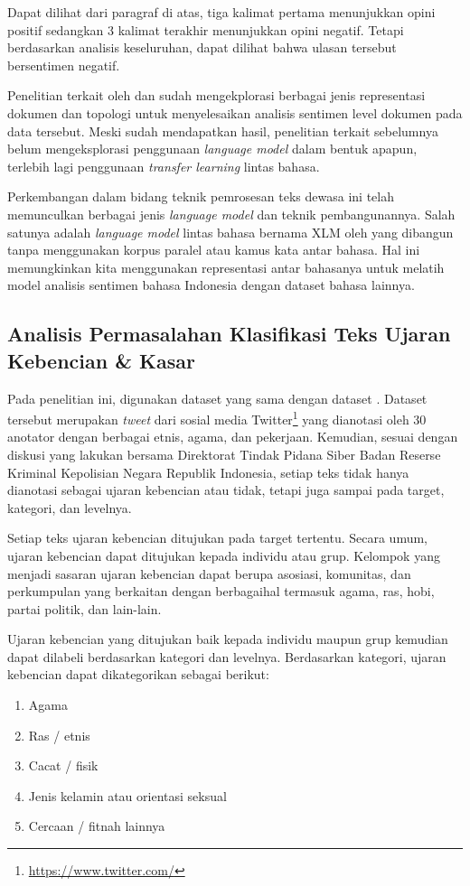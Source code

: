 	Dapat dilihat dari paragraf di atas, tiga kalimat pertama menunjukkan opini positif sedangkan 3 kalimat terakhir menunjukkan opini negatif. Tetapi berdasarkan analisis keseluruhan, dapat dilihat bahwa ulasan tersebut bersentimen negatif.

	Penelitian terkait oleh \parencite{FarhanKhodra2017} dan \parencite{CrisdayantiPurwarianti2019} sudah mengekplorasi berbagai jenis representasi dokumen dan topologi untuk menyelesaikan analisis sentimen level dokumen pada data tersebut. Meski sudah mendapatkan hasil, penelitian terkait sebelumnya belum mengeksplorasi penggunaan \textit{language model} dalam bentuk apapun, terlebih lagi penggunaan \textit{transfer learning} lintas bahasa.

	Perkembangan dalam bidang teknik pemrosesan teks dewasa ini telah memunculkan berbagai jenis \textit{language model} dan teknik pembangunannya. Salah satunya adalah \textit{language model} lintas bahasa bernama XLM oleh \parencite{LampleConneau2019} yang dibangun tanpa menggunakan korpus paralel atau kamus kata antar bahasa. Hal ini memungkinkan kita menggunakan representasi antar bahasanya untuk melatih model analisis sentimen bahasa Indonesia dengan dataset bahasa lainnya.

	\subsection{Analisis Permasalahan Klasifikasi Teks Ujaran Kebencian \& Kasar}

	Pada penelitian ini, digunakan dataset yang sama dengan dataset \parencite{Ibrohim_Budi_2019}. Dataset tersebut merupakan \textit{tweet} dari sosial media Twitter\footnote{\url{https://www.twitter.com/}} yang dianotasi oleh 30 anotator dengan berbagai etnis, agama, dan pekerjaan. Kemudian, sesuai dengan diskusi yang \parencite{Diksusi_Bareskrim} lakukan bersama Direktorat Tindak Pidana Siber Badan Reserse Kriminal Kepolisian Negara Republik Indonesia, setiap teks tidak hanya dianotasi sebagai ujaran kebencian atau tidak, tetapi juga sampai pada target, kategori, dan levelnya. 

	Setiap teks ujaran kebencian ditujukan pada target tertentu. Secara umum, ujaran kebencian dapat ditujukan kepada individu atau grup. Kelompok yang menjadi sasaran ujaran kebencian dapat berupa asosiasi, komunitas, dan perkumpulan yang berkaitan dengan berbagaihal termasuk agama, ras, hobi, partai politik, dan lain-lain.

	Ujaran kebencian yang ditujukan baik kepada individu maupun grup kemudian dapat dilabeli berdasarkan kategori dan levelnya. Berdasarkan kategori, ujaran kebencian dapat dikategorikan sebagai berikut:
	\begin{enumerate}
		\item Agama
		\item Ras / etnis
		\item Cacat / fisik
		\item Jenis kelamin atau orientasi seksual
		\item Cercaan / fitnah lainnya
	\end{enumerate}

